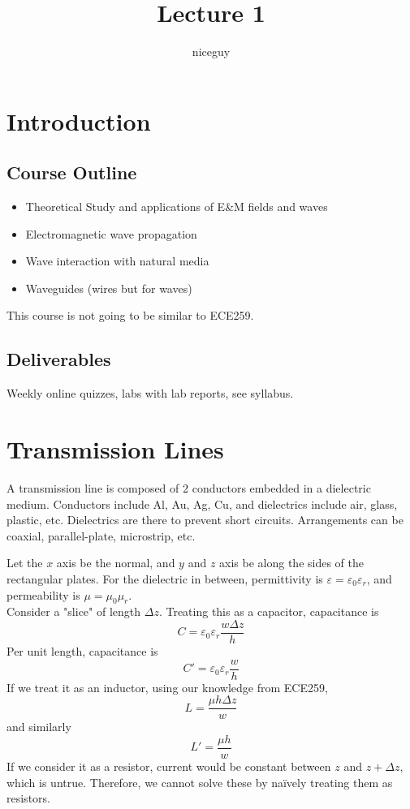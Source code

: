 \documentclass[12pt]{article}
\author{niceguy}
\title{Lecture 1}
\begin{document}
\maketitle

\section{Introduction}

\subsection{Course Outline}

\begin{itemize}
    \item Theoretical Study and applications of E\&M fields and waves
    \item Electromagnetic wave propagation
    \item Wave interaction with natural media
    \item Waveguides (wires but for waves)
\end{itemize}

This course is not going to be similar to ECE259.

\subsection{Deliverables}

Weekly online quizzes, labs with lab reports, see syllabus.

\section{Transmission Lines}

A transmission line is composed of 2 conductors embedded in a dielectric medium. Conductors include Al, Au, Ag, Cu, and dielectrics include air, glass, plastic, etc. Dielectrics are there to prevent short circuits. Arrangements can be coaxial, parallel-plate, microstrip, etc.

\begin{ex}
    Let the $x$ axis be the normal, and $y$ and $z$ axis be along the sides of the rectangular plates. For the dielectric in between, permittivity is $\varepsilon = \varepsilon_0\varepsilon_r$, and permeability is $\mu = \mu_0\mu_r$. \\
    Consider a "slice" of length $\Delta z$. Treating this as a capacitor, capacitance is
    $$C = \varepsilon_0\varepsilon_r \frac{w\Delta z}{h}$$
    Per unit length, capacitance is
    $$C' = \varepsilon_0\varepsilon_r \frac{w}{h}$$
    If we treat it as an inductor, using our knowledge from ECE259,
    $$L = \frac{\mu h\Delta z}{w}$$
    and similarly
    $$L' = \frac{\mu h}{w}$$
    If we consider it as a resistor, current would be constant between $z$ and $z+\Delta z$, which is untrue. Therefore, we cannot solve these by na\"ively treating them as resistors.
\end{ex}
\end{document}
